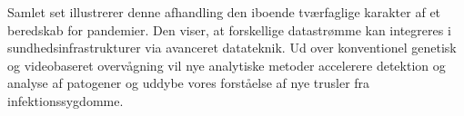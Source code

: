 Samlet set illustrerer denne afhandling den iboende tværfaglige karakter af et beredskab for pandemier. Den viser, at forskellige datastrømme kan integreres i sundhedsinfrastrukturer via avanceret datateknik. Ud over konventionel genetisk og videobaseret overvågning vil nye analytiske metoder accelerere detektion og analyse af patogener og uddybe vores forståelse af nye trusler fra infektionssygdomme.



